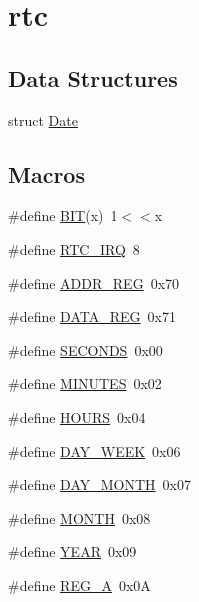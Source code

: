 \hypertarget{group__rtc}{}\section{rtc}
\label{group__rtc}
\subsection*{Data Structures}
\begin{DoxyCompactItemize}
\item 
struct \mbox{\hyperlink{struct_date}{Date}}
\end{DoxyCompactItemize}
\subsection*{Macros}
\begin{DoxyCompactItemize}
\item 
\#define \mbox{\hyperlink{group__rtc_gad27cc17b25bb93134368d5eb21126eae}{B\+IT}}(x)~1$<$$<$x
\item 
\#define \mbox{\hyperlink{group__rtc_ga4e22feb6ffbc1cda32fadff5c740dc51}{R\+T\+C\+\_\+\+I\+RQ}}~8
\item 
\#define \mbox{\hyperlink{group__rtc_gaee714b0468cb683740ae28b1e0ad25e6}{A\+D\+D\+R\+\_\+\+R\+EG}}~0x70
\item 
\#define \mbox{\hyperlink{group__rtc_ga71b8ba376f687142f60a82d18c2715e0}{D\+A\+T\+A\+\_\+\+R\+EG}}~0x71
\item 
\#define \mbox{\hyperlink{group__rtc_ga48fcf4f2eeef6769d588168d4ac2ab0e}{S\+E\+C\+O\+N\+DS}}~0x00
\item 
\#define \mbox{\hyperlink{group__rtc_ga84be9dcfa5a172ee83121620d15c8e29}{M\+I\+N\+U\+T\+ES}}~0x02
\item 
\#define \mbox{\hyperlink{group__rtc_ga212d0f839f6f7ca43ccde311f93d5892}{H\+O\+U\+RS}}~0x04
\item 
\#define \mbox{\hyperlink{group__rtc_gacd522b0e92d01c9bb65527206fc17508}{D\+A\+Y\+\_\+\+W\+E\+EK}}~0x06
\item 
\#define \mbox{\hyperlink{group__rtc_gaa652d6d52e8e86bfd3659f873c87a340}{D\+A\+Y\+\_\+\+M\+O\+N\+TH}}~0x07
\item 
\#define \mbox{\hyperlink{group__rtc_ga3729d06495d9713592f79f3122c9e677}{M\+O\+N\+TH}}~0x08
\item 
\#define \mbox{\hyperlink{group__rtc_ga5871356500f559add06ea81d60331b1b}{Y\+E\+AR}}~0x09
\item 
\#define \mbox{\hyperlink{group__rtc_gaa0e40d1cb9fea79e800aa79b8ca291f7}{R\+E\+G\+\_\+A}}~0x0A
$$
\end{DoxyCompactItemize}
